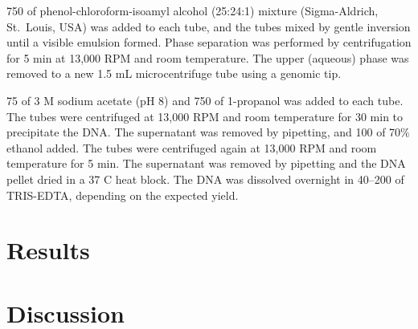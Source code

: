 750 \microlitre{} of phenol-chloroform-isoamyl alcohol (25:24:1) mixture (Sigma-Aldrich, St.\ Louis, USA) was added to each tube, and the tubes mixed by gentle inversion until a visible emulsion formed.
Phase separation was performed by centrifugation for 5 min at 13,000 RPM and room temperature.
The upper (aqueous) phase was removed to a new 1.5 mL microcentrifuge tube using a genomic tip.

75 \microlitre{} of 3 M sodium acetate (pH 8) and 750 \microlitre{} of 1-propanol was added to each tube.
The tubes were centrifuged at 13,000 RPM and room temperature for 30 min to precipitate the DNA.
The supernatant was removed by pipetting, and 100 \microlitre{} of 70\% ethanol added.
The tubes were centrifuged again at 13,000 RPM and room temperature for 5 min.
The supernatant was removed by pipetting and the DNA pellet dried in a 37 \textdegree{}C heat block.
The DNA was dissolved overnight in 40--200 \microlitre{} of TRIS-EDTA, depending on the expected yield.

\section{Results}

\section{Discussion}
